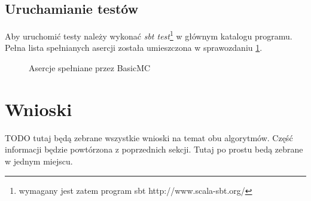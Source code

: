 \documentclass[12pt, a4paper]{article}
\begin{document}
\subsection{Uruchamianie testów}
Aby uruchomić testy należy wykonać \textit{sbt test}\footnote{wymagany jest zatem program sbt http://www.scala-sbt.org/} w głównym katalogu programu. Pełna lista spełnianych asercji została umieszczona w sprawozdaniu \ref{fig:tests}.

\begin{figure}[H]
  \begin{center}
  \end{center}
  \caption{Asercje spełniane przez BasicMC}
  \label{fig:tests}
\end{figure}


\section{Wnioski}

TODO tutaj będą zebrane wszystkie wnioski na temat obu algorytmów. Część informacji będzie powtórzona z poprzednich sekcji. Tutaj po prostu bedą zebrane w jednym miejscu.


\nocite{*}


\end{document}
